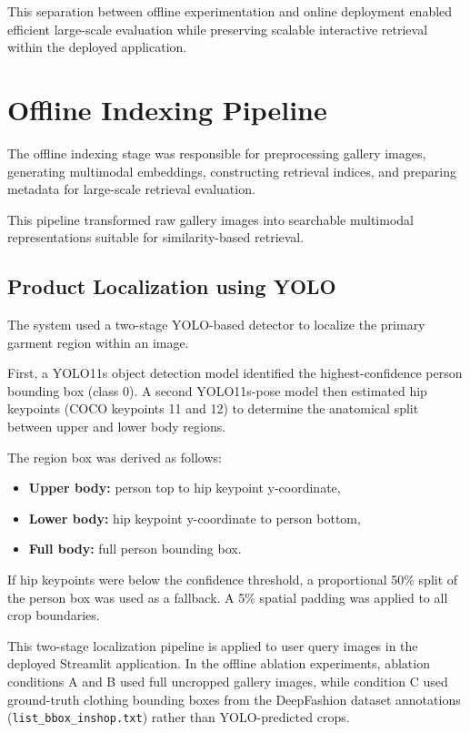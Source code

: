 \documentclass[11pt,a4paper]{article}
\begin{document}
This separation between offline experimentation and online deployment enabled efficient large-scale evaluation while preserving scalable interactive retrieval within the deployed application.

\section{Offline Indexing Pipeline}

The offline indexing stage was responsible for preprocessing gallery images, generating multimodal embeddings, constructing retrieval indices, and preparing metadata for large-scale retrieval evaluation.

This pipeline transformed raw gallery images into searchable multimodal representations suitable for similarity-based retrieval.

\subsection{Product Localization using YOLO}

The system used a two-stage YOLO-based detector to localize the primary garment region within an image.

First, a YOLO11s object detection model identified the highest-confidence person bounding box (class 0). A second YOLO11s-pose model then estimated hip keypoints (COCO keypoints 11 and 12) to determine the anatomical split between upper and lower body regions.

The region box was derived as follows:
\begin{itemize}
    \item \textbf{Upper body:} person top to hip keypoint y-coordinate,
    \item \textbf{Lower body:} hip keypoint y-coordinate to person bottom,
    \item \textbf{Full body:} full person bounding box.
\end{itemize}

If hip keypoints were below the confidence threshold, a proportional 50\% split of the person box was used as a fallback. A 5\% spatial padding was applied to all crop boundaries.

This two-stage localization pipeline is applied to user query images in the deployed Streamlit application. In the offline ablation experiments, ablation conditions A and B used full uncropped gallery images, while condition C used ground-truth clothing bounding boxes from the DeepFashion dataset annotations (\texttt{list\_bbox\_inshop.txt}) rather than YOLO-predicted crops.
\end{document}
